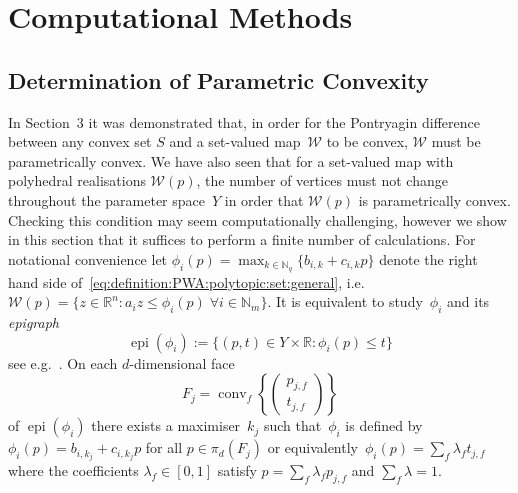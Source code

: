 \documentclass[smallextended]{svjour3}       %
\numberwithin{equation}{section}
\DeclareMathOperator*{\conv}{conv}
\DeclareMathOperator{\epi}{epi}
\begin{document}
\section{Computational Methods}\label{sec:computational:methods}
%
%
%
\subsection{Determination of Parametric Convexity}
%
In Section~3 it was demonstrated that, in order for the
Pontryagin difference between any convex set $S$ and a set-valued
map~$\mathcal W$ to be convex, $\mathcal W$ must be parametrically
convex.
%
We have also seen that for a set-valued map with polyhedral realisations $\mathcal W(p)$, the number of vertices must not change throughout the parameter space~$Y$ in order that $\mathcal W(p)$ is parametrically convex.
%
Checking this condition may seem computationally challenging, however
we show in this section that it suffices to perform a finite number of calculations.
%
For notational convenience let $\phi_i(p) = \max_{k\in\mathbb N_q}\{b_{i,k}+c_{i,k}p\}$ denote the right hand side of~\eqref{eq:definition:PWA:polytopic:set:general}, i.e. $\mathcal W(p) = \{z\in\mathbb R^n: a_i z\leq \phi_i(p)\;\forall i\in\mathbb N_m\}$.
%
It is equivalent to study~$\phi_i$ and its \emph{epigraph} 
%
$$
	\epi(\phi_i) := \{(p,t)\in Y\times\mathbb R: \phi_i(p)\leq t\}
$$
%
see e.g.~\cite{Gorokhovik:1993}.
%
On each $d$-dimensional face 
%
\begin{equation}\label{eq:conv:hull:facet:of:epigraph}
F_j = \conv_f \left\{\left(\begin{array}{c}p_{j,f}\\ t_{j,f}\end{array}\right)\right\}
\end{equation}
%
of $\epi(\phi_i)$ there exists a maximiser~$k_j$ such that~$\phi_i$ is defined by~$\phi_i(p)=b_{i,k_j}+c_{i,k_j}p$ for all $p\in\pi_d(F_j)$ or equivalently~$\phi_i(p)=\sum_{f}\lambda_f t_{j,f}$ where the coefficients
$\lambda_f \in [0,1]$ satisfy 
$p=\sum_{f}\lambda_f p_{j,f}$ and $\sum_f\lambda=1$.
%
\end{document}
